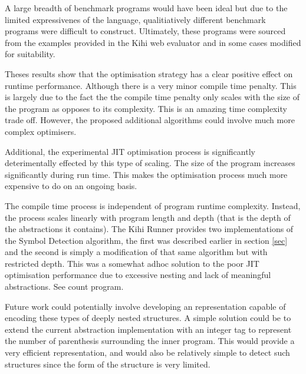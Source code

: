 A large breadth of benchmark programs would have been ideal but due to the limited expressivenes of the language, qualitiatively different benchmark programs were difficult to construct. Ultimately, these programs were sourced from the examples provided in the Kihi web evaluator and in some cases modified for suitability.

Theses results show that the optimisation strategy has a clear positive effect on runtime performance. Although there is a very minor compile time penalty. This is largely due to the fact the the compile time penalty only scales with the size of the program as opposes to its complexity. This is an amazing time complexity trade off. However, the proposed additional algorithms could involve much more complex optimisers.

Additional, the experimental JIT optimisation process is significantly deterimentally effected by this type of scaling. The size of the program increases significantly during run time. This makes the optimisation process much more expensive to do on an ongoing basis.



The compile time process is independent of program runtime complexity. Instead, the process scales linearly with program
length and depth (that is the depth of the abstractions it contains). The Kihi Runner provides two implementations of the Symbol Detection algorithm, the first was described earlier in section \ref{sec} and the second is simply a modification of that same algorithm but with restricted depth. This was a somewhat adhoc solution to the poor JIT optimisation performance due to excessive nesting and lack of meaningful abstractions. See count program.

Future work could potentially involve developing an representation capable of encoding these types of deeply nested structures. A simple solution could be to extend the current abstraction implementation with an integer tag to represent the number of parenthesis surrounding the inner program. This would provide a very efficient representation, and would also be relatively simple to detect such structures since the form of the structure is very limited.

